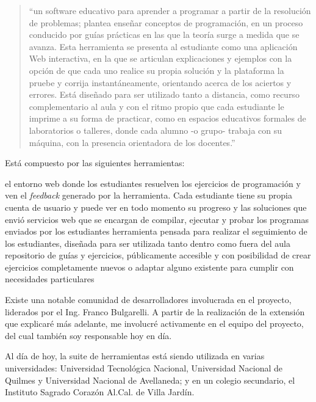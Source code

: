 \begin{quote}
``un software educativo para aprender a programar a partir de la resolución de problemas; plantea enseñar conceptos de programación, en un proceso conducido por guías prácticas en las que la teoría surge a medida que se avanza. Esta herramienta se presenta al estudiante como una aplicación Web interactiva, en la que se articulan explicaciones y ejemplos con la opción de que cada uno realice su propia solución y la plataforma la pruebe y corrija instantáneamente, orientando acerca de los aciertos y errores. Está diseñado para ser utilizado tanto a distancia, como recurso complementario al aula y con el ritmo propio que cada estudiante le imprime a su forma de practicar, como en espacios educativos formales de laboratorios o talleres, donde cada alumno -o grupo- trabaja con su máquina, con la presencia orientadora de los docentes.''\cite{PaperMumuki}
\end{quote}

Está compuesto por las siguientes herramientas:
\begin{itemize}
   el entorno web donde los estudiantes resuelven los ejercicios de programación y ven el \textit{feedback} generado por la herramienta. Cada estudiante tiene su propia cuenta de usuario y puede ver en todo momento su progreso y las soluciones que envió
   servicios web que se encargan de compilar, ejecutar y probar los programas enviados por los estudiantes
   herramienta pensada para realizar el seguimiento de los estudiantes, diseñada para ser utilizada tanto dentro como fuera del aula
   repositorio de guías y ejercicios, públicamente accesible y con posibilidad de crear ejercicios completamente nuevos o adaptar alguno existente para cumplir con necesidades particulares
\end{itemize}

Existe una notable comunidad de desarrolladores involucrada en el proyecto, liderados por el Ing. Franco Bulgarelli. A partir de la realización de la extensión que explicaré más adelante, me involucré activamente en el equipo del proyecto, del cual también soy responsable hoy en día.

Al día de hoy, la suite de herramientas está siendo utilizada en varias universidades: Universidad Tecnológica Nacional, Universidad Nacional de Quilmes y Universidad Nacional de Avellaneda; y en un colegio secundario, el Instituto Sagrado Corazón Al.Cal. de Villa Jardín.

